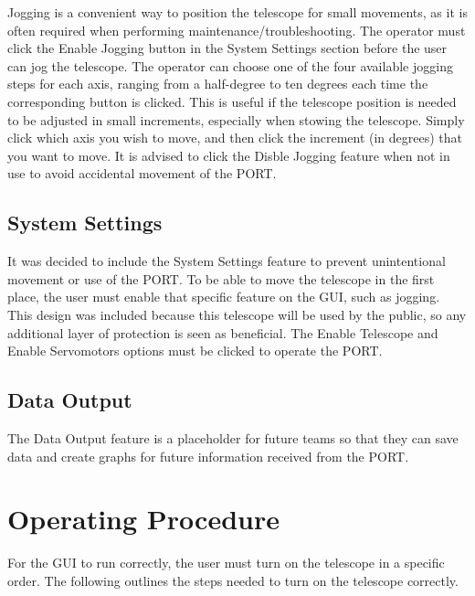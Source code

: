 \documentclass{article}
\begin{document}
Jogging is a convenient way to position the telescope for small movements, as it is often required when performing maintenance/troubleshooting. The operator must click the Enable Jogging button in the System Settings section before the user can jog the telescope. The operator can choose one of the four available jogging steps for each axis, ranging from a half-degree to ten degrees each time the corresponding button is clicked. This is useful if the telescope position is needed to be adjusted in small increments, especially when stowing the telescope. Simply click which axis you wish to move, and then click the increment (in degrees) that you want to move. It is advised to click the Disble Jogging feature when not in use to avoid accidental movement of the PORT.

\subsection{System Settings}

It was decided to include the System Settings feature to prevent unintentional movement or use of the PORT. To be able to move the telescope in the first place, the user must enable that specific feature on the GUI, such as jogging. This design was included because this telescope will be used by the public, so any additional layer of protection is seen as beneficial. The Enable Telescope and Enable Servomotors options must be clicked to operate the PORT.

\subsection{Data Output}

The Data Output feature is a placeholder for future teams so that they can save data and create graphs for future information received from the PORT. 

\section{Operating Procedure}

For the GUI to run correctly, the user must turn on the telescope in a specific order. The following outlines the steps needed to turn on the telescope correctly.
\end{document}
